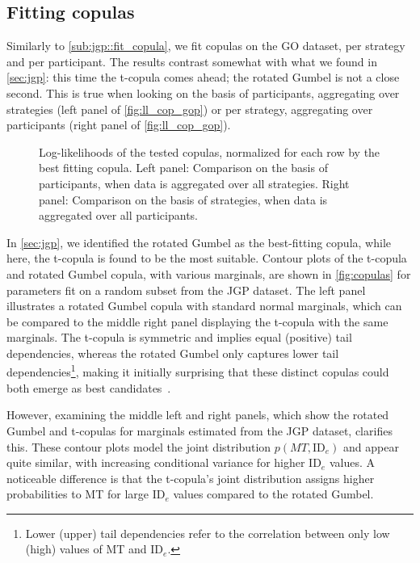 \documentclass[manuscript,review,anonymous]{acmart}
\newcommand{\ide}{\ensuremath{{\text{ID}_e}}\xspace}
\begin{document}
\subsection{Fitting copulas}
Similarly to \autoref{sub:jgp::fit_copula}, we fit copulas on the GO dataset, per strategy and per participant. The results contrast somewhat with what we found in \autoref{sec:jgp}: this time the t-copula comes ahead; the rotated Gumbel is not a close second. This is true when looking on the basis of participants, aggregating over strategies (left panel of \autoref{fig:ll_cop_gop}) or per strategy, aggregating over participants (right panel of \autoref{fig:ll_cop_gop}).

\begin{figure}[htbp]
	\centering
	\caption{Log-likelihoods of the tested copulas, normalized for each row by the best fitting copula. Left panel: Comparison on the basis of participants, when data is aggregated over all strategies. Right panel: Comparison on the basis of strategies, when data is aggregated over all participants.}
	\label{fig:ll_cop_gop}
\end{figure}

In \autoref{sec:jgp}, we identified the rotated Gumbel as the best-fitting copula, while here, the t-copula is found to be the most suitable. Contour plots of the t-copula and rotated Gumbel copula, with various marginals, are shown in \autoref{fig:copulas} for parameters fit on a random subset from the JGP dataset.
The left panel illustrates a rotated Gumbel copula with standard normal marginals, which can be compared to the middle right panel displaying the t-copula with the same marginals. The t-copula is symmetric and implies equal (positive) tail dependencies, whereas the rotated Gumbel only captures lower tail dependencies\footnote{Lower (upper) tail dependencies refer to the correlation between only low (high) values of MT and \ide.}, making it initially surprising that these distinct copulas could both emerge as best candidates~\cite{demarta2005,nelsen2006}.

However, examining the middle left and right panels, which show the rotated Gumbel and t-copulas for marginals estimated from the JGP dataset, clarifies this. These contour plots model the joint distribution $p(MT,\ide)$ and appear quite similar, with increasing conditional variance for higher \ide values. A noticeable difference is that the t-copula's joint distribution assigns higher probabilities to MT for large \ide values compared to the rotated Gumbel.
\end{document}
